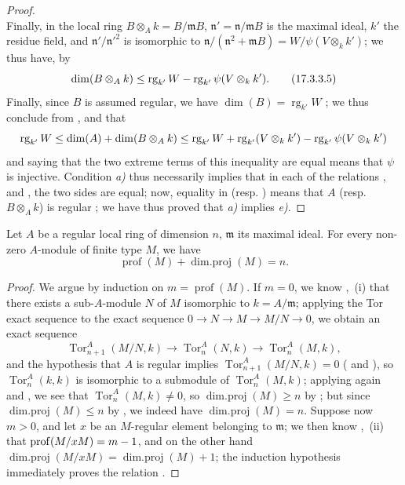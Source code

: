 \begin{proof}
\[  \tag{17.3.3.4}
\]
Finally, in the local ring $B\otimes_A k=B/\mathfrak{m}B$, $\mathfrak{n}'=\mathfrak{n}/\mathfrak{m}B$ is the maximal ideal, $k'$ the residue field, and $\mathfrak{n}'/\mathfrak{n}'^2$ is isomorphic to $\mathfrak{n}/(\mathfrak{n}^2+\mathfrak{m}B)=W/\psi(V\otimes_k k')$;
we thus have, by 
\[
\label{0.17.3.3.5}
  \dim(B\otimes_A k)\leq\operatorname{rg}_{k'}W-\operatorname{rg}_{k'}\psi(V\otimes_k k').
  \tag{17.3.3.5}
\]
Finally, since $B$ is assumed regular, we have $\dim(B)=\operatorname{rg}_{k'}W$ ;
we thus conclude from ,  and  that
\[
  \operatorname{rg}_{k'}W\leq\dim(A)+\dim(B\otimes_A k)\leq\operatorname{rg}_{k'}W+\operatorname{rg}_{k'}(V\otimes_k k')-\operatorname{rg}_{k'}\psi(V\otimes_k k')
\]
and saying that the two extreme terms of this inequality are equal means that $\psi$ is injective.
Condition \emph{a)} thus necessarily implies that in each of the relations ,  and , the two sides are equal;
now, equality in  (resp. ) means that $A$ (resp. $B\otimes_A k$) is regular ;
we have thus proved that \emph{a)} implies \emph{e)}.
\end{proof}

\begin{proposition}[17.3.4]
\label{0.17.3.4}
Let $A$ be a regular local ring of dimension $n$, $\mathfrak{m}$ its maximal ideal.
For every non-zero $A$-module of finite type $M$, we have
\[
\label{0.17.3.4.1}
  \operatorname{prof}(M)+\operatorname{dim.proj}(M)=n.
  \tag{17.3.4.1}
\]
\end{proposition}

\begin{proof}
We argue by induction on $m=\operatorname{prof}(M)$.
If $m=0$, we know ,~(i) that there exists a sub-$A$-module $N$ of $M$ isomorphic to $k=A/\mathfrak{m}$;
applying the Tor exact sequence to the exact sequence $0\to N\to M\to M/N\to 0$, we obtain an exact sequence
\[
  \operatorname{Tor}^A_{n+1}(M/N,k)\to\operatorname{Tor}^A_n(N,k)\to\operatorname{Tor}^A_n(M,k),
\]
and the hypothesis that $A$ is regular implies $\operatorname{Tor}^A_{n+1}(M/N,k)=0$ ( and ), so $\operatorname{Tor}^A_n(k,k)$ is isomorphic to a submodule of $\operatorname{Tor}^A_n(M,k)$;
applying again  and , we see that $\operatorname{Tor}^A_n(M,k)\neq 0$, so $\operatorname{dim.proj}(M)\geq n$ by ;
but since $\operatorname{dim.proj}(M)\leq n$ by , we indeed have $\operatorname{dim.proj}(M)=n$.
Suppose now $m>0$, and let $x$ be an $M$-regular element belonging to $\mathfrak{m}$;
we then know ,~(ii) that $\operatorname{prof}(M/xM)=m- 1$, and on the other hand  $\operatorname{dim.proj}(M/xM)=\operatorname{dim.proj}(M)+1$;
the induction hypothesis immediately proves the relation .
\end{proof}

